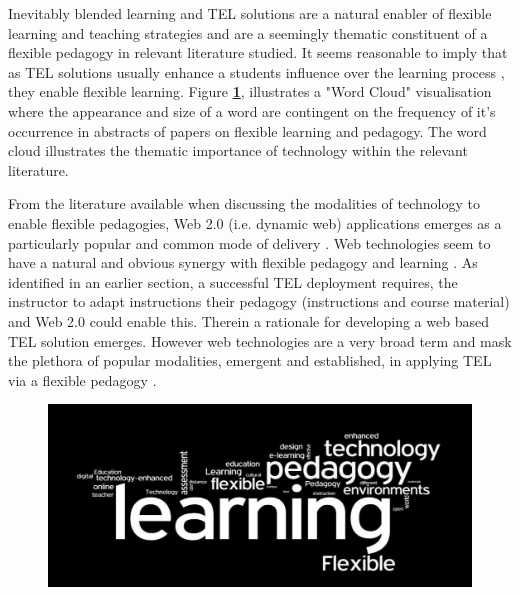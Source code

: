 Inevitably blended learning and TEL solutions  are a natural enabler of flexible learning and teaching strategies and are a seemingly thematic constituent of a flexible pedagogy in relevant literature studied. It seems reasonable to imply that as TEL solutions usually enhance a students influence over the learning process \cite{Gordon2014,Burge2011}, they enable flexible learning.  Figure \textbf{\ref{fig:Wordle Word Cloud}}, illustrates a "Word Cloud" visualisation where the appearance  and size of a word are contingent on the frequency of it's occurrence in abstracts of papers on flexible learning and pedagogy. The word cloud illustrates the thematic importance of technology within the relevant literature. 

From the literature available when discussing the modalities of technology to enable flexible pedagogies, Web 2.0 (i.e. dynamic web) applications emerges as a particularly popular and common mode of delivery \cite{Gordon2014,Burge2011}. Web technologies seem to have a natural and obvious synergy with flexible pedagogy and learning \cite{Gordon2014,Burge2011}. As identified in an earlier section, a successful TEL deployment requires, the instructor to adapt instructions their pedagogy (instructions and course material) and Web 2.0 could enable this. Therein a rationale for developing a web based TEL solution emerges. However web technologies are a very broad term and mask the plethora of popular modalities, emergent and established, in applying TEL via a flexible pedagogy \cite{Burge2011,Gordon2014,Harger1996}.

\newpage
\begin{figure}[H]
	\centering
	\includegraphics[scale=0.5]{figures/wordCloud}
	\label{fig:Wordle Word Cloud}
\end{figure}


